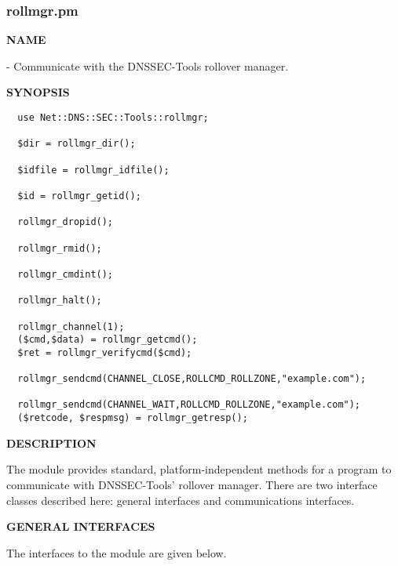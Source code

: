 \clearpage

\subsubsection{rollmgr.pm}

{\bf NAME}

 - Communicate with the DNSSEC-Tools
rollover manager.

{\bf SYNOPSIS}

\begin{verbatim}
  use Net::DNS::SEC::Tools::rollmgr;

  $dir = rollmgr_dir();

  $idfile = rollmgr_idfile();

  $id = rollmgr_getid();

  rollmgr_dropid();

  rollmgr_rmid();

  rollmgr_cmdint();

  rollmgr_halt();

  rollmgr_channel(1);
  ($cmd,$data) = rollmgr_getcmd();
  $ret = rollmgr_verifycmd($cmd);

  rollmgr_sendcmd(CHANNEL_CLOSE,ROLLCMD_ROLLZONE,"example.com");

  rollmgr_sendcmd(CHANNEL_WAIT,ROLLCMD_ROLLZONE,"example.com");
  ($retcode, $respmsg) = rollmgr_getresp();
\end{verbatim}

{\bf DESCRIPTION}

The  module provides standard,
platform-independent methods for a program to communicate with DNSSEC-Tools'
 rollover manager.  There are two interface classes described
here:  general interfaces and communications interfaces.

{\bf GENERAL INTERFACES}

The interfaces to the  module are given
below.

